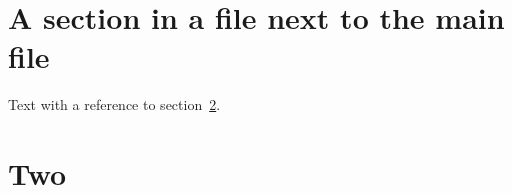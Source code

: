\section{A section in a file next to the main file}
Text with a reference to section~\ref{sec:two}.
\section{Two}\label{sec:two}
